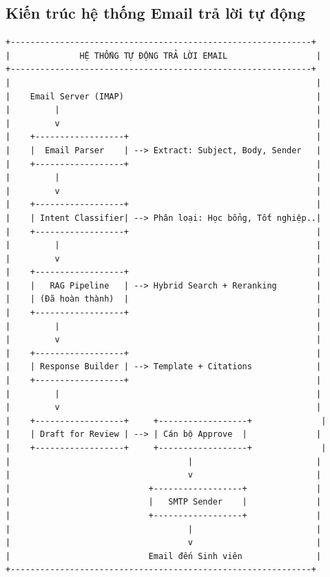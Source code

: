 \documentclass[../DoAn.tex]{subfiles}
\begin{document}
\subsection{Kiến trúc hệ thống Email trả lời tự động}
\begin{verbatim}
+-------------------------------------------------------------+
|              HỆ THỐNG TỰ ĐỘNG TRẢ LỜI EMAIL                  |
+-------------------------------------------------------------+
|                                                              |
|    Email Server (IMAP)                                       |
|         |                                                    |
|         v                                                    |
|    +------------------+                                      |
|    |  Email Parser    | --> Extract: Subject, Body, Sender   |
|    +------------------+                                      |
|         |                                                    |
|         v                                                    |
|    +------------------+                                      |
|    | Intent Classifier| --> Phân loại: Học bổng, Tốt nghiệp..|
|    +------------------+                                      |
|         |                                                    |
|         v                                                    |
|    +------------------+                                      |
|    |   RAG Pipeline   | --> Hybrid Search + Reranking        |
|    | (Đã hoàn thành)  |                                      |
|    +------------------+                                      |
|         |                                                    |
|         v                                                    |
|    +------------------+                                      |
|    | Response Builder | --> Template + Citations             |
|    +------------------+                                      |
|         |                                                    |
|         v                                                    |
|    +------------------+     +------------------+              |
|    | Draft for Review | --> | Cán bộ Approve  |              |
|    +------------------+     +------------------+              |
|                                    |                         |
|                                    v                         |
|                            +------------------+              |
|                            |   SMTP Sender    |              |
|                            +------------------+              |
|                                    |                         |
|                                    v                         |
|                            Email đến Sinh viên               |
+-------------------------------------------------------------+
\end{verbatim}
\end{document}
